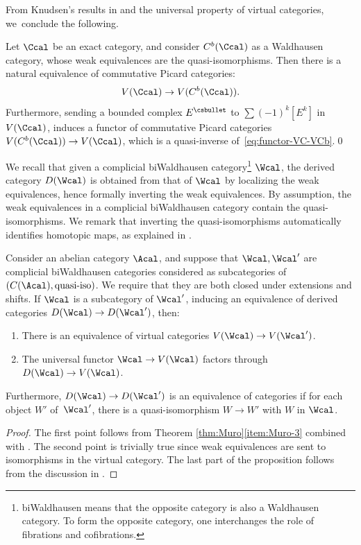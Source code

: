 From Knudsen's results in \cite{Knudsen} and the universal property of virtual categories, we~conclude the following.
\begin{corollary}\label{cor:equivalence-virtual-C-Cb}
Let $\Ccal$ be an exact category, and consider $C^{b}(\Ccal)$ as a Waldhausen category, whose weak equivalences are the quasi-isomorphisms. Then there is a natural equivalence of commutative Picard categories:
\begin{equation}\label{eq:functor-VC-VCb}
V(\Ccal) \to V(C^b(\Ccal)).
\end{equation}
Furthermore, sending a bounded complex $E^{\csbullet}$ to $\sum (-1)^{k}[E^{k}]$ in $V(\Ccal)$, induces a functor of commutative Picard categories $V(C^{b}(\Ccal))\to V(\Ccal)$, which is a quasi-inverse of~\eqref{eq:functor-VC-VCb}.\qed
\end{corollary}

We recall that given a complicial biWaldhausen category\footnote{biWaldhausen means that the opposite category is also a Waldhausen category. To form the opposite category, one interchanges the role of fibrations and cofibrations.} $\Wcal$, the derived category $D(\Wcal)$ is obtained from that of $\Wcal$ by localizing the weak equivalences, hence formally inverting the weak equivalences. By assumption, the weak equivalences in a complicial biWaldhausen category contain the quasi-isomorphisms. We remark that inverting the quasi-isomorphisms automatically identifies homotopic maps, as explained in \cite[.6]{ThomasonTrobaugh}.

\begin{proposition}\label{prop:derivedvirtual}
Consider an abelian category $\Acal$, and suppose that $\Wcal, \Wcal'$ are complicial biWaldhausen categories considered as subcategories of $(C(\Acal), \hbox{quasi-iso})$. We require that they are both closed under extensions and shifts. If $\Wcal$ is a subcategory of $\Wcal'$, inducing an equivalence of derived categories $D(\Wcal) \to D(\Wcal')$, then:

\begin{enumerate}
\item There is an equivalence of virtual categories $V(\Wcal)\to V(\Wcal')$.
\item The universal functor $\Wcal \to V(\Wcal)$ factors through $D(\Wcal)\to V(\Wcal)$.
\end{enumerate}
Furthermore, $D(\Wcal) \to D(\Wcal')$ is an equivalence of categories if for each object $W'$ of~$\Wcal'$, there is a quasi-isomorphism $W \to W'$ with $W$ in $\Wcal$.

\end{proposition}
\begin{proof}
The first point follows from Theorem \ref{thm:Muro}\eqref{item:Muro-3} combined with \cite[Th.\,1.9.8 \& Ex.\,1.3.6]{ThomasonTrobaugh}. The second point is trivially true since weak equivalences are sent to isomorphisms in the virtual category. The last part of the proposition follows from the discussion in \cite[.7]{ThomasonTrobaugh}.
\end{proof}

